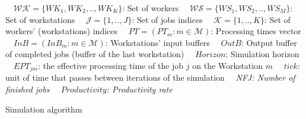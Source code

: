 \documentclass[review,12pt, 3p, times]{elsarticle}
\begin{document}
\begin{algorithm2e}[H]  
  \scriptsize
	\KwData{}	 
	\ \ $\mathcal{WK}=\{WK_1, WK_2,.., WK_K\}$: Set of workers\;
	\ \ $\mathcal{WS}=\{WS_1,WS_2,..,WS_M\}$: Set of workstations\;
	\ \ $\mathcal{J}=\{1,..,J\}$: Set of jobs indices\;
	\ \ $\mathcal{K}=\{1,..,K\}$: Set of workers' (workstations) indices\;
	\ \ $PT=(PT_{m}:  m\in\mathcal{M})$: Processing times vector\;
	\ \ $InB=(InB_m: m\in\mathcal{M})$: Workstations' input buffers\;
	\ \ $OutB$: Output buffer of completed jobs (buffer of the last workstation)\;
	\ \ $Horizon$: Simulation horizon\;
	\ \  $EPT_{jm}$: the effective processing time of the job $j$ on the Workstation $m$\;
	\ \ $tick$: unit of time that passes between iterations of the simulation \;
	\KwResult{}
	\ \ \it{NFJ}: Number of finished jobs  \; 
	\ \ $Productivity$: Productivity rate  \;
	\caption{Simulation algorithm}
            \label{algo:algorithmsimulator}
\end{algorithm2e}	   
				
\end{document}

